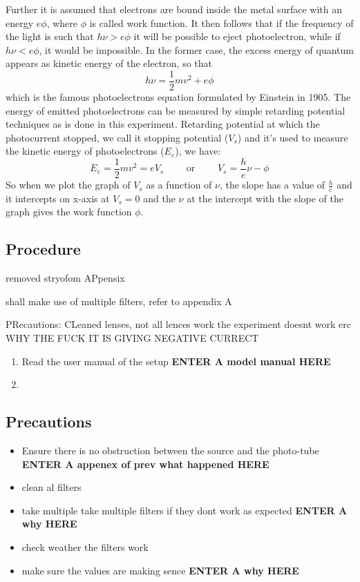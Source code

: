\documentclass[%
 sor,
 jor,
 amsmath,amssymb,
 reprint,%
]{revtex4-2}
\begin{document}
Further it is assumed that electrons are bound inside the metal surface with an energy $e\phi$, where $\phi$ is called work function. It then follows that if the frequency of the light is such that $h\nu > e \phi$ it will be possible to eject photoelectron, while if $h\nu < e \phi$, it would be impossible. In the former case, the excess energy of quantum appears as kinetic energy of the electron, so that \begin{equation}h\nu = \frac 1 2 mv^2 + e\phi \end{equation} which is the famous photoelectrons equation formulated by Einstein in 1905. The energy of emitted photoelectrons can be measured by simple retarding potential techniques as is done in this experiment.
Retarding potential at which the photocurrent stopped, we call it stopping potential ($V_s$) and it's used to measure the kinetic energy of photoelectrons ($E_e$), we have: 
\begin{equation}E_e = \frac 1 2 mv^2 = eV_s \,\,\,\,\,\,\,\,\,\,\,\,\,\,  \text{or} \,\,\,\,\,\,\,\,\,\,\,\,\,\, V_s = \frac h e \nu-\phi \end{equation}
So when we plot the graph of $V_s$ as a function of $\nu$, the slope has a value of $\frac h e $ and it intercepts on x-axis at $V_s = 0$ and the $\nu$ at the intercept with the slope of the graph gives the work function $\phi$.


\subsection{Procedure}
removed stryofom APpensix

 shall make use of multiple filters, refer to appendix A

PRecautions: 
CLeaned lenses, 
not all lences work
the experiment doesnt work erc
WHY THE FUCK IT IS GIVING NEGATIVE CURRECT
\begin{enumerate}
  \item Read the user manual of the setup \textbf{ENTER A model manual HERE}
  \item 
\end{enumerate}

\subsection{Precautions}
\begin{itemize}
  \item Ensure there is no obstruction between the source and the photo-tube \textbf{ENTER A appenex of prev what happened HERE}
  \item clean al filters
  \item take multiple take multiple filters if they dont work as expected \textbf{ENTER A why HERE}
  \item check weather the filters work
  \item make sure the values are making sence \textbf{ENTER A why HERE}
\end{itemize}
\end{document}
